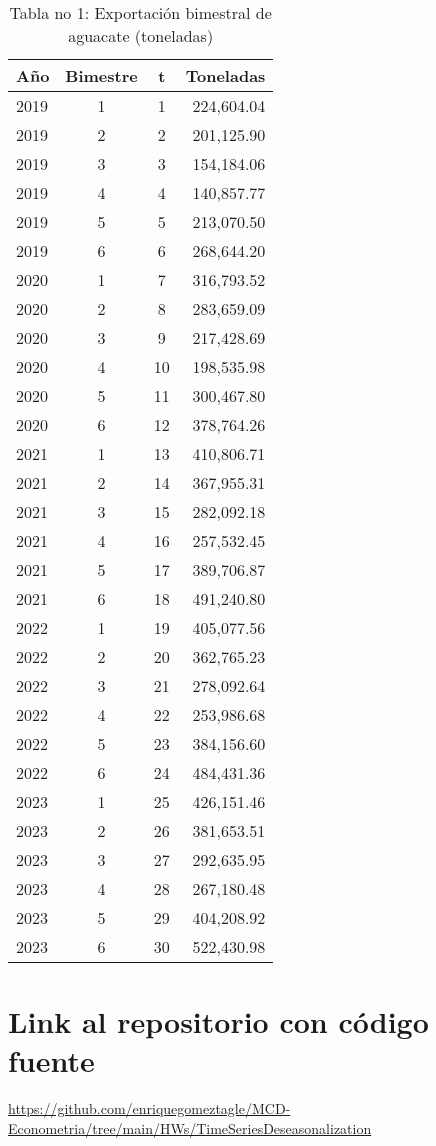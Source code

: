 \documentclass[10pt]{article}
\begin{document}
\begin{table}[H]
\centering
\caption{Tabla no 1: Exportación bimestral de aguacate (toneladas)}
\label{tab:export_avocado}
\begin{tabular}{l c c r}
\hline
\textbf{Año} & \textbf{Bimestre} & \textbf{t} & \textbf{Toneladas} \\
\hline
2019 & 1 & 1  & 224,604.04 \\
2019 & 2 & 2  & 201,125.90 \\
2019 & 3 & 3  & 154,184.06 \\
2019 & 4 & 4  & 140,857.77 \\
2019 & 5 & 5  & 213,070.50 \\
2019 & 6 & 6  & 268,644.20 \\
2020 & 1 & 7  & 316,793.52 \\
2020 & 2 & 8  & 283,659.09 \\
2020 & 3 & 9  & 217,428.69 \\
2020 & 4 & 10 & 198,535.98 \\
2020 & 5 & 11 & 300,467.80 \\
2020 & 6 & 12 & 378,764.26 \\
2021 & 1 & 13 & 410,806.71 \\
2021 & 2 & 14 & 367,955.31 \\
2021 & 3 & 15 & 282,092.18 \\
2021 & 4 & 16 & 257,532.45 \\
2021 & 5 & 17 & 389,706.87 \\
2021 & 6 & 18 & 491,240.80 \\
2022 & 1 & 19 & 405,077.56 \\
2022 & 2 & 20 & 362,765.23 \\
2022 & 3 & 21 & 278,092.64 \\
2022 & 4 & 22 & 253,986.68 \\
2022 & 5 & 23 & 384,156.60 \\
2022 & 6 & 24 & 484,431.36 \\
2023 & 1 & 25 & 426,151.46 \\
2023 & 2 & 26 & 381,653.51 \\
2023 & 3 & 27 & 292,635.95 \\
2023 & 4 & 28 & 267,180.48 \\
2023 & 5 & 29 & 404,208.92 \\
2023 & 6 & 30 & 522,430.98 \\
\hline
\end{tabular}
\end{table}

\section{Link al repositorio con código fuente}
\href{https://github.com/enriquegomeztagle/MCD-Econometria/tree/main/HWs/TimeSeriesDeseasonalization}{https://github.com/enriquegomeztagle/MCD-Econometria/tree/main/HWs/TimeSeriesDeseasonalization}
\end{document}
